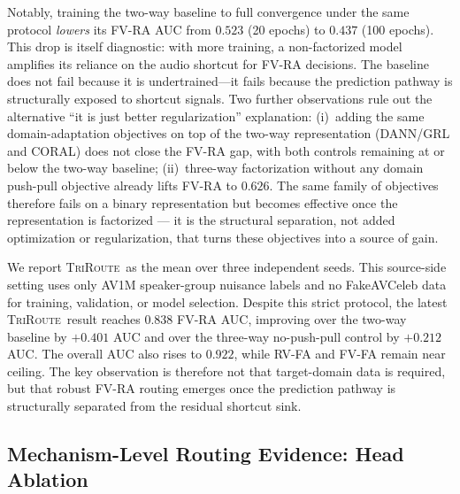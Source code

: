 \documentclass{article}
\newcommand{\method}{\textsc{TriRoute}}
\begin{document}
Notably, training the two-way baseline to full convergence under the same protocol \emph{lowers} its FV-RA AUC from $0.523$ (20 epochs) to $0.437$ (100 epochs). This drop is itself diagnostic: with more training, a non-factorized model amplifies its reliance on the audio shortcut for FV-RA decisions. The baseline does not fail because it is undertrained---it fails because the prediction pathway is structurally exposed to shortcut signals. Two further observations rule out the alternative ``it is just better regularization'' explanation: (i)~adding the same domain-adaptation objectives on top of the two-way representation (DANN/GRL and CORAL) does not close the FV-RA gap, with both controls remaining at or below the two-way baseline; (ii)~three-way factorization without any domain push-pull objective already lifts FV-RA to $0.626$. The same family of objectives therefore fails on a binary representation but becomes effective once the representation is factorized --- it is the structural separation, not added optimization or regularization, that turns these objectives into a source of gain.

We report \method\ as the mean over three independent seeds. This source-side setting uses only AV1M speaker-group nuisance labels and no FakeAVCeleb data for training, validation, or model selection. Despite this strict protocol, the latest \method\ result reaches $0.838$ FV-RA AUC, improving over the two-way baseline by $+0.401$ AUC and over the three-way no-push-pull control by $+0.212$ AUC. The overall AUC also rises to $0.922$, while RV-FA and FV-FA remain near ceiling. The key observation is therefore not that target-domain data is required, but that robust FV-RA routing emerges once the prediction pathway is structurally separated from the residual shortcut sink.

\subsection{Mechanism-Level Routing Evidence: Head Ablation}
\end{document}
